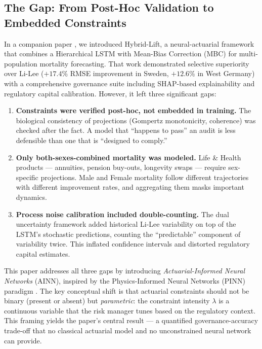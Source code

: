 \documentclass[11pt,a4paper]{article}
\begin{document}
\subsection{The Gap: From Post-Hoc Validation to Embedded Constraints}

In a companion paper \cite{rindori2026p04}, we introduced Hybrid-Lift, a neural-actuarial framework that combines a Hierarchical LSTM with Mean-Bias Correction (MBC) for multi-population mortality forecasting. That work demonstrated selective superiority over Li-Lee ($+17.4\%$ RMSE improvement in Sweden, $+12.6\%$ in West Germany) with a comprehensive governance suite including SHAP-based explainability and regulatory capital calibration. However, it left three significant gaps:

\begin{enumerate}
    \item \textbf{Constraints were verified post-hoc, not embedded in training.} The biological consistency of projections (Gompertz monotonicity, coherence) was checked after the fact. A model that ``happens to pass'' an audit is less defensible than one that is ``designed to comply.''
    \item \textbf{Only both-sexes-combined mortality was modeled.} Life \& Health products --- annuities, pension buy-outs, longevity swaps --- require sex-specific projections. Male and Female mortality follow different trajectories with different improvement rates, and aggregating them masks important dynamics.
    \item \textbf{Process noise calibration included double-counting.} The dual uncertainty framework added historical Li-Lee variability on top of the LSTM's stochastic predictions, counting the ``predictable'' component of variability twice. This inflated confidence intervals and distorted regulatory capital estimates.
\end{enumerate}

This paper addresses all three gaps by introducing \textit{Actuarial-Informed Neural Networks} (AINN), inspired by the Physics-Informed Neural Networks (PINN) paradigm \cite{raissi2019pinn}. The key conceptual shift is that actuarial constraints should not be binary (present or absent) but \textit{parametric}: the constraint intensity $\lambda$ is a continuous variable that the risk manager tunes based on the regulatory context. This framing yields the paper's central result --- a quantified governance-accuracy trade-off that no classical actuarial model and no unconstrained neural network can provide.
\end{document}
